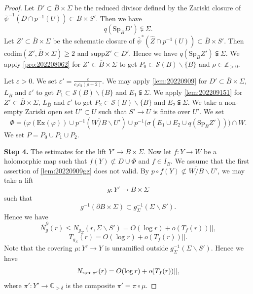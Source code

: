\documentclass[11pt,english]{smfart}
\theoremstyle{plain}
\theoremstyle{definition}
\theoremstyle{remark}
\numberwithin{equation}{section}
\theoremstyle{plain}
\newcommand{\pN}[1]{\bar{N}_{#1}^{\partial}}
\newcommand{\ram}{{\rm ram}\,}
\begin{document}
\begin{proof}
		Let $D'\subset \overline{B}\times \Sigma$ be the reduced divisor defined by the Zariski closure of $\bar{\psi}^{-1}(\overline{D}\cap p^{-1}(U))\subset \overline{B}\times S'$.
		Then we have
		$$
		q(\mathrm{Sp}_BD')\subsetneqq \Sigma.
		$$
		Let $Z'\subset \overline{B}\times \Sigma$ be the schematic closure of $\bar{\psi}^{*}(\widehat{Z}\cap p^{-1}(U))\subset \overline{B}\times S'$.
		Then $\mathrm{codim}(Z',\overline{B}\times \Sigma)\geq 2$ and $\mathrm{supp}Z'\subset D'$.
		Hence we have $q(\mathrm{Sp}_BZ')\subsetneqq \Sigma$.
		We apply \cref{pro:202208062} for $Z'\subset \overline{B}\times \Sigma$ to get $P_0\subset \mathcal{S}(B)\backslash\{B\}$ and $\rho\in \mathbb Z_{>0}$.
		
		
		
		
		
		
		Let $\varepsilon>0$.
		We set $\varepsilon'=\frac{\varepsilon}{c_1c_2(\rho+2)}$.
		We may apply \cref{lem:20220909} for $D'\subset \overline{B}\times \Sigma$, $L_{\overline{B}}$ and $\varepsilon'$ to get $P_1\subset \mathcal{S}(B)\backslash\{B\}$ and $E_1\subsetneqq \Sigma$.
		We apply \cref{lem:202209151} for $Z'\subset \overline{B}\times \Sigma$, $L_{\overline{B}}$ and $\varepsilon'$ to get $P_2\subset \mathcal{S}(B)\backslash\{B\}$ and $E_2\subsetneqq \Sigma$.
		We take a non-empty Zariski open set $U'\subset U$ such that $S'\to U$ is finite over $U'$.
		We set 
		$$\Phi=\big( \varphi(\mathrm{Ex}(\varphi))\cup p^{-1}(\overline{W/B}\backslash U')\cup p^{-1}(\sigma (E_1\cup E_2\cup q(\mathrm{Sp}_BZ'))\big) \cap W.$$
		We set $P=P_0\cup P_1\cup P_2$.
		
		\textbf{Step 4.} The estimates for the lift $Y'\to \overline{B}\times \Sigma$.
		Now let $f:Y\to W$ be a holomorphic map such that $f(Y)\not\subset D\cup \Phi$ and $f\in I_B$.
		We assume that the first assertion of \cref{lem:20220909gg} does not valid.
		By $p\circ f(Y)\not\subset \overline{W/B}\backslash U'$, we may take a lift 
		$$g:Y'\to \overline{B}\times \Sigma$$ 
		such that 
		$$g^{-1}(\partial B\times \Sigma)\subset g_{\Sigma}^{-1}(\Sigma\backslash S').$$
		Hence we have 
		\begin{equation*}
			\pN{g}(r)\leq N_{g_{\Sigma}}(r,\Sigma\backslash S')=O(\log r)+o(T_f(r))||,
		\end{equation*}
		\begin{equation*}
			T_{g_{\Sigma}}(r)=O(\log r)+o(T_f(r))||.
		\end{equation*}
		Note that the covering $\mu:Y'\to Y$ is unramified outside $g_{\Sigma}^{-1}(\Sigma\backslash S')$.
		Hence we have
		\begin{equation*}
			N_{\ram\pi'}(r)=O(\log r)+o(T_f(r))||,
		\end{equation*}
		where $\pi':Y'\to \mathbb C_{>\delta}$ is the composite $\pi'=\pi\circ \mu$.
		

\end{proof}
\end{document}
